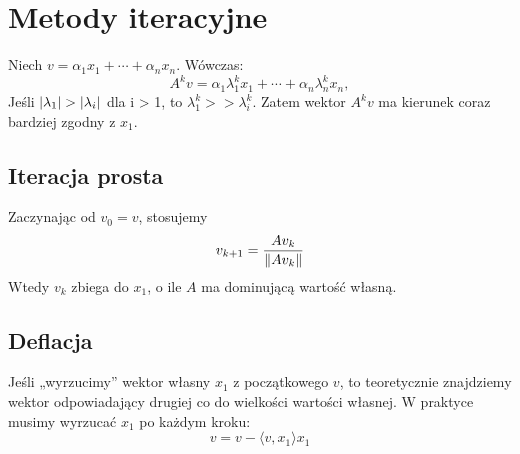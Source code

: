 \section{Metody iteracyjne}
Niech \( v = \alpha_1x_1 + \cdots + \alpha_nx_n \). Wówczas:
\[
    A^kv =\alpha_1\lambda_1^kx_1 + \cdots + \alpha_n\lambda_n^kx_n,
\]
Jeśli \( \left\lvert\lambda_1\right\rvert > \left\lvert\lambda_i\right\rvert \) dla i > 1, to \( \lambda_1^k >\!\!> \lambda_i^k \). Zatem wektor \( A^kv \) ma kierunek coraz bardziej zgodny z \( x_1 \). 

\subsection{Iteracja prosta}
Zaczynając od \( v_0 = v \), stosujemy
\[
    v_{k+1} = \frac{Av_k}{\left\Vert Av_k \right\Vert}
\]
Wtedy \( v_ k \) zbiega do \( x_1 \), o ile \( A \) ma dominującą wartość własną.

\subsection{Deflacja}
Jeśli „wyrzucimy” wektor własny \( x_1 \) z początkowego \( v \), to teoretycznie znajdziemy wektor odpowiadający drugiej co do wielkości wartości własnej. W praktyce musimy wyrzucać \( x_1 \) po każdym kroku:
\[
    v = v - \langle v, x_1 \rangle x_1
\]
